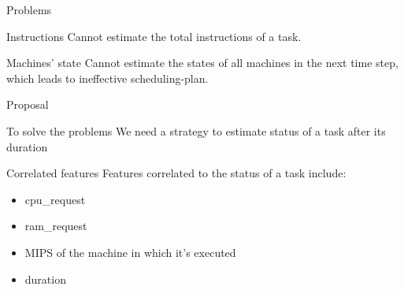 \documentclass[10pt,xcolor={dvipsnames}, aspectratio=169]{beamer}
\begin{document}
\begin{frame}
	{Problems} 
	\begin{block}
		{Instructions} 
		Cannot estimate the total instructions of a task. 
	\end{block}
	
	\begin{block}
		{Machines' state}
		Cannot estimate the states of all machines in the next time step, which leads to ineffective scheduling-plan.
	\end{block}
\end{frame}

\begin{frame}
	{Proposal}
	\begin{block}
	{To solve the problems} 
	We need a strategy to estimate status of a task after its duration
	\end{block}
	
	\begin{block}
		{Correlated features} 
		Features correlated to the status of a task include: 
		\begin{itemize}
			\item cpu\_request
			\item ram\_request
			\item MIPS of the machine in which it's executed
			\item duration
		\end{itemize}
	\end{block}
\end{frame}


{\1
\begin{frame}
\end{frame}}
\end{document}
